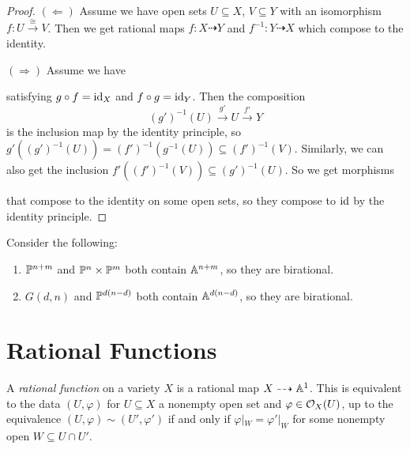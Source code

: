 \begin{proof}
  $(\Leftarrow)$ Assume we have open
  sets $U \subseteq X$, $V \subseteq Y$
  with an isomorphism $f : U \overset{\cong}{\longrightarrow} V$.
  Then we get rational maps
  $f : X \dashrightarrow Y$ and
  $f^{-1} : Y \dashrightarrow X$ which
  compose to the identity.

  $(\Rightarrow)$ Assume we have
  \begin{center}
  \end{center}
  satisfying $g \circ f = \operatorname{id}_X$
  and $f \circ g = \operatorname{id}_Y$.
  Then the composition
  \[
    (g')^{-1}(U) \overset{g'}{\longrightarrow} U \overset{f'}{\longrightarrow} Y
  \]
  is the inclusion map by the identity
  principle, so $g'((g')^{-1}(U)) = (f')^{-1}(g^{-1}(U)) \subseteq (f')^{-1}(V)$.
  Similarly, we can also get the inclusion
  $f'((f')^{-1}(V)) \subseteq (g')^{-1}(U)$.
  So we get morphisms
  \begin{center}
  \end{center}
  that compose to the identity on
  some open sets, so they compose to
  $\operatorname{id}$ by the identity principle.
\end{proof}

\begin{example}
  Consider the following:
  \begin{enumerate}
    \item  $\mathbb{P}^{n + m}$
      and $\mathbb{P}^n \times \mathbb{P}^m$ both
      contain $\mathbb{A}^{n + m}$,
      so they are birational.
    \item $G(d, n)$ and $\mathbb{P}^{d(n - d)}$
      both contain $\mathbb{A}^{d(n - d)}$,
      so they are birational.
  \end{enumerate}
\end{example}

\section{Rational Functions}

\begin{definition}
  A \emph{rational function} on a variety
  $X$ is a rational map
  $X \dashrightarrow \mathbb{A}^1$.
  This is equivalent to the data
  $(U, \varphi)$ for $U \subseteq X$ a
  nonempty open set and
  $\varphi \in \mathcal{O}_X(U)$, up to the
  equivalence $(U, \varphi) \sim (U', \varphi')$
  if and only if $\varphi|_W = \varphi'|_W$
  for some nonempty open $W \subseteq U \cap U'$.
\end{definition}

